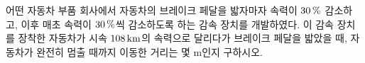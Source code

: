 어떤 자동차 부품 회사에서 자동차의 브레이크 페달을 밟자마자 속력이 $30\mkern3mu \%$ 감소하고, 이후 매초 속력이 $30\mkern3mu \%$씩 감소하도록 하는 감속 장치를 개발하였다. 이 감속 장치를 장착한 자동차가 시속 $108\mkern3mu \mathrm{km}$의 속력으로 달리다가 브레이크 페달을 밟았을 때, 자동차가 완전히 멈출 때까지 이동한 거리는 몇 $\mathrm{m}$인지 구하시오.
